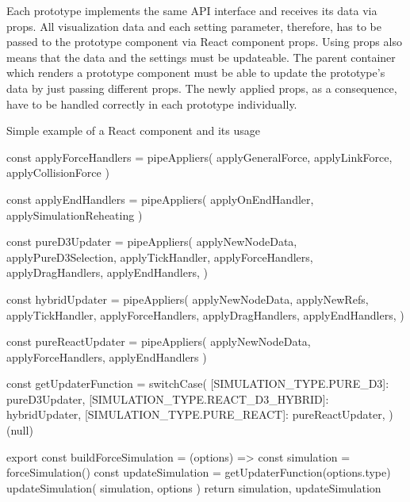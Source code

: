 Each prototype implements the same API interface and receives its data via props. All visualization data and each setting parameter, therefore, has to be passed to the prototype component via React component props. Using props also means that the data and the settings must be updateable. The parent container which renders a prototype component must be able to update the prototype's data by just passing different props. The newly applied props, as a consequence, have to be handled correctly in each prototype individually.

\begin{program}[H]
\caption{Simple example of a React component and its usage} 
\label{prog:forceBuildModule}
\begin{JsCode}
const applyForceHandlers = pipeAppliers(
  applyGeneralForce, 
  applyLinkForce, 
  applyCollisionForce
)

const applyEndHandlers = pipeAppliers(
  applyOnEndHandler, 
  applySimulationReheating
)

const pureD3Updater = pipeAppliers(
  applyNewNodeData,
  applyPureD3Selection,
  applyTickHandler,
  applyForceHandlers,
  applyDragHandlers,
  applyEndHandlers,
)

const hybridUpdater = pipeAppliers(
  applyNewNodeData,
  applyNewRefs,
  applyTickHandler,
  applyForceHandlers,
  applyDragHandlers,
  applyEndHandlers,
)

const pureReactUpdater = pipeAppliers(
  applyNewNodeData, 
  applyForceHandlers, 
  applyEndHandlers
)

const getUpdaterFunction = switchCase({
  [SIMULATION_TYPE.PURE_D3]: pureD3Updater,
  [SIMULATION_TYPE.REACT_D3_HYBRID]: hybridUpdater,
  [SIMULATION_TYPE.PURE_REACT]: pureReactUpdater,
})(null)

export const buildForceSimulation = (options) => {
  const simulation = forceSimulation()
  const updateSimulation = getUpdaterFunction(options.type)
  updateSimulation({ simulation, options })
  return { simulation, updateSimulation }
}
\end{JsCode}
\end{program}



